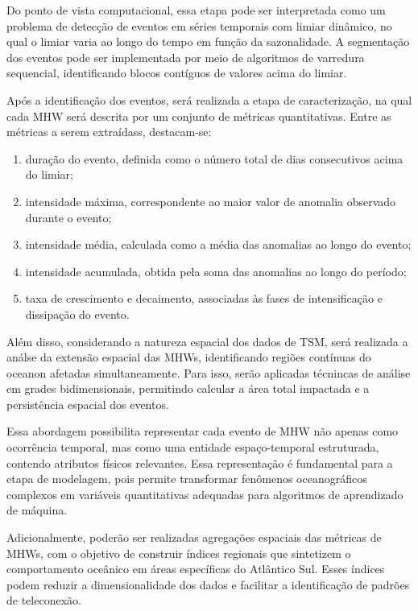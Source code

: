 	Do ponto de vista computacional, essa etapa pode ser interpretada como um problema de detecção de eventos em séries temporais com limiar dinâmico, no qual o limiar varia ao longo do tempo em função da sazonalidade.
	A segmentação dos eventos pode ser implementada por meio de algoritmos de varredura sequencial, identificando blocos contíguos de valores acima do limiar.

	Após a identificação dos eventos, será realizada a etapa de caracterização, na qual cada MHW será descrita por um conjunto de métricas quantitativas.
	Entre as métricas a serem extraídass, destacam-se:

	\begin{enumerate}
		[label=(\roman*)]
		\item duração do evento, definida como o número total de dias consecutivos acima do limiar;
		\item intensidade máxima, correspondente ao maior valor de anomalia observado durante o evento;
		\item intensidade média, calculada como a média das anomalias ao longo do evento;
		\item intensidade acumulada, obtida pela soma das anomalias ao longo do período;
		\item taxa de crescimento e decaimento, associadas às fases de intensificação e dissipação do evento.

	\end{enumerate}

	Além disso, considerando a natureza espacial dos dados de TSM, será realizada a análse da extensão espacial das MHWs, identificando regiões contínuas do oceanon afetadas simultaneamente.
	Para isso, serão aplicadas técnincas de análise em grades bidimensionais, permitindo calcular a área total impactada e a persistência espacial dos eventos.

	Essa abordagem possibilita representar cada evento de MHW não apenas como ocorrência temporal, mas como uma entidade espaço-temporal estruturada, contendo atributos físicos relevantes.
	Essa representação é fundamental para a etapa de modelagem, pois permite transformar fenômenos oceanográficos complexos em variáveis quantitativas adequadas para algoritmos de aprendizado de máquina.

	Adicionalmente, poderão ser realizadas agregações espaciais das métricas de MHWs, com o objetivo de construir índices regionais que sintetizem o comportamento oceânico em áreas específicas do Atlântico Sul.
	Esses índices podem reduzir a dimensionalidade dos dados e facilitar a identificação de padrões de teleconexão.

